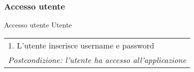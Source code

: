 \begin{minipage}{\textwidth}
    \subsubsection{Accesso utente}
    \usecase
        {Accesso utente}
        {Utente}
        {
            \begin{tabular}{l}
                1. L'utente inserisce username e password\\
                \textit{Postcondizione: l'utente ha accesso all'applicazione}
            \end{tabular} \\
        }
        \vspace{0.5cm}

\end{minipage}